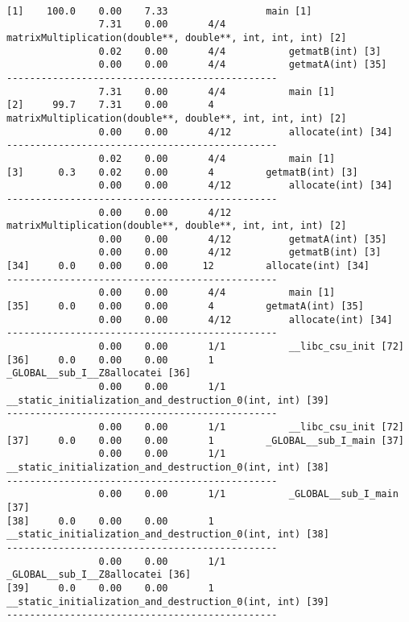 \documentclass[7pt]{article}
\begin{document}
\begin{verbatim}

[1]    100.0    0.00    7.33                 main [1]
                7.31    0.00       4/4           matrixMultiplication(double**, double**, int, int, int) [2]
                0.02    0.00       4/4           getmatB(int) [3]
                0.00    0.00       4/4           getmatA(int) [35]
-----------------------------------------------
                7.31    0.00       4/4           main [1]
[2]     99.7    7.31    0.00       4         matrixMultiplication(double**, double**, int, int, int) [2]
                0.00    0.00       4/12          allocate(int) [34]
-----------------------------------------------
                0.02    0.00       4/4           main [1]
[3]      0.3    0.02    0.00       4         getmatB(int) [3]
                0.00    0.00       4/12          allocate(int) [34]
-----------------------------------------------
                0.00    0.00       4/12          matrixMultiplication(double**, double**, int, int, int) [2]
                0.00    0.00       4/12          getmatA(int) [35]
                0.00    0.00       4/12          getmatB(int) [3]
[34]     0.0    0.00    0.00      12         allocate(int) [34]
-----------------------------------------------
                0.00    0.00       4/4           main [1]
[35]     0.0    0.00    0.00       4         getmatA(int) [35]
                0.00    0.00       4/12          allocate(int) [34]
-----------------------------------------------
                0.00    0.00       1/1           __libc_csu_init [72]
[36]     0.0    0.00    0.00       1         _GLOBAL__sub_I__Z8allocatei [36]
                0.00    0.00       1/1           __static_initialization_and_destruction_0(int, int) [39]
-----------------------------------------------
                0.00    0.00       1/1           __libc_csu_init [72]
[37]     0.0    0.00    0.00       1         _GLOBAL__sub_I_main [37]
                0.00    0.00       1/1           __static_initialization_and_destruction_0(int, int) [38]
-----------------------------------------------
                0.00    0.00       1/1           _GLOBAL__sub_I_main [37]
[38]     0.0    0.00    0.00       1         __static_initialization_and_destruction_0(int, int) [38]
-----------------------------------------------
                0.00    0.00       1/1           _GLOBAL__sub_I__Z8allocatei [36]
[39]     0.0    0.00    0.00       1         __static_initialization_and_destruction_0(int, int) [39]
-----------------------------------------------

\end{verbatim}
\end{document}
